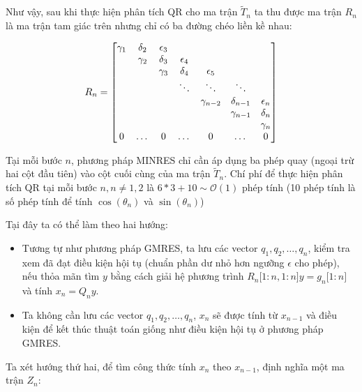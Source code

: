 \documentclass[14pt, a4paper]{article}
\numberwithin{equation}{section}
\numberwithin{algorithm}{section}
\numberwithin{figure}{section}
\numberwithin{dl}{section}
\numberwithin{md}{section}
\numberwithin{bd}{section}
\numberwithin{dn}{section}
\numberwithin{hq}{section}
\begin{document}
Như vậy, sau khi thực hiện phân tích QR cho ma trận $\widetilde{T}_n$ ta thu được ma trận $R_n$ là ma trận tam giác trên nhưng chỉ có ba đường chéo liền kề nhau:

\begin{equation}
    R_n = \begin{bmatrix}
        \gamma_1 & \delta_2 & \epsilon_3 & \space & \space & \space & \space \\
        \space & \gamma_2 & \delta_3 & \epsilon_4 & \space & \space & \space \\
        \space & \space  & \gamma_3 & \delta_4 & \epsilon_5 & \space & \space \\
        \space & \space & \space & \ddots & \ddots & \ddots & \space \\
        \space & \space & \space & \space & \gamma_{n-2} & \delta_{n-1} & \epsilon_n \\
        \space & \space & \space & \space & \space & \gamma_{n-1} & \delta_n \\
        \space & \space & \space & \space & \space & \space & \gamma_n \\
        0 & \dots & 0 & \dots & 0 & \dots & 0
    \end{bmatrix}
\end{equation}

Tại mỗi bước $n$, phương pháp MINRES chỉ cần áp dụng ba phép quay (ngoại trừ hai cột đầu tiên) vào cột cuối cùng của ma trận $\widetilde{T}_n$. Chí phí để thực hiện phân tích QR tại mỗi bước $n, n \neq 1, 2$ là $6*3 + 10 \sim \mathcal{O}(1)$ phép tính (10 phép tính là số phép tính để tính $\cos(\theta_n)$ và $\sin(\theta_n)$)

Tại đây ta có thể làm theo hai hướng:

\begin{itemize}
    \item Tương tự như phương pháp GMRES, ta lưu các vector $q_1, q_2, \dots, q_n$, kiểm tra xem đã đạt điều kiện hội tụ (chuẩn phần dư nhỏ hơn ngưỡng $\epsilon$ cho phép), nếu thỏa mãn tìm $y$ bằng cách giải hệ phương trình $R_n\lbrack 1:n, 1:n\rbrack y=g_n\lbrack 1:n \rbrack$ và tính $x_n=Q_n y$.
    \item Ta không cần lưu các vector $q_1, q_2, \dots, q_n$, $x_n$ sẽ được tính từ $x_{n-1}$ và điều kiện để kết thúc thuật toán giống như điều kiện hội tụ ở phương pháp GMRES.
\end{itemize}

Ta xét hướng thứ hai, để tìm công thức tính $x_n$ theo $x_{n-1}$, \cite{greenbaum1997iterative} định nghĩa một ma trận $Z_n$:
\end{document}
